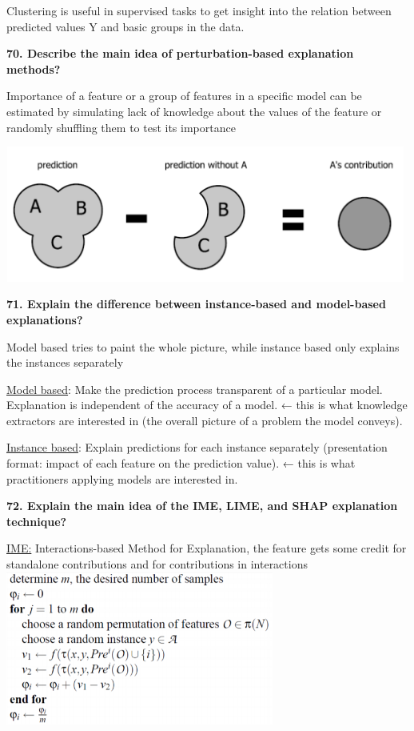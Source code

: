 Clustering is useful in supervised tasks to get insight into the
relation between predicted values Y and basic groups in the data.

\textbf{70. Describe the main idea of perturbation-based explanation
methods?}

Importance of a feature or a group of features in a specific model can
be estimated by simulating lack of knowledge about the values of the
feature or randomly shuffling them to test its importance

\includegraphics[width=5.18229in,height=1.75613in]{media/image6.png}

\textbf{71. Explain the difference between instance-based and
model-based explanations?}

Model based tries to paint the whole picture, while instance based only
explains the instances separately

\underline{Model based}: Make the prediction process transparent of a
particular model. Explanation is independent of the accuracy of a model.
← this is what knowledge extractors are interested in (the overall
picture of a problem the model conveys).

\underline{Instance based}: Explain predictions for each instance
separately (presentation format: impact of each feature on the
prediction value). ← this is what practitioners applying models are
interested in.

\textbf{72. Explain the main idea of the IME, LIME, and SHAP explanation
technique?}

\underline{IME:} Interactions-based Method for Explanation, the feature
gets some credit for standalone contributions and for contributions in
interactions\includegraphics[width=3.46576in,height=1.98044in]{media/image21.png}

